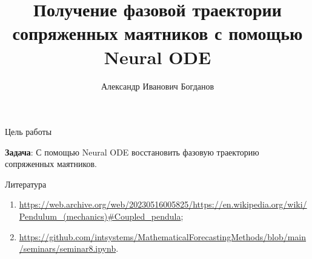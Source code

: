 \documentclass{beamer}
\title[\hbox to 56mm{Получение фазовой траектории сопряженных маятников с помощью Neural ODE}]{Получение фазовой траектории сопряженных маятников с помощью Neural ODE}
\author[А. Б. Богданов]{Александр Иванович Богданов}
\institute[]{Московский физико-технический институт}
\date{\footnotesize
\par \textbf{Lab 405a}
\par\smallskip\emph{Курс:} Прогнозирование временных рядов}
\begin{document}

\begin{frame}

    \maketitle

\end{frame}


\begin{frame}{Цель работы}

    \textbf{Задача}: С помощью Neural ODE восстановить фазовую траекторию сопряженных маятников.

\end{frame}


\begin{frame}{Литература}

    \begin{enumerate}
        \item \url{https://web.archive.org/web/20230516005825/https://en.wikipedia.org/wiki/Pendulum_(mechanics)\#Coupled_pendula};

        \item \url{https://github.com/intsystems/MathematicalForecastingMethods/blob/main/seminars/seminar8.ipynb}.
    \end{enumerate}
    
\end{frame}

\end{document}

